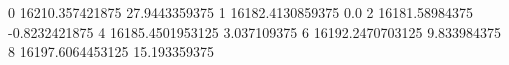 0 16210.357421875 27.9443359375
1 16182.4130859375 0.0
2 16181.58984375 -0.8232421875
4 16185.4501953125 3.037109375
6 16192.2470703125 9.833984375
8 16197.6064453125 15.193359375
